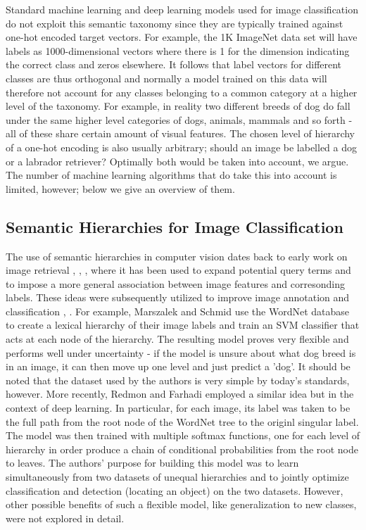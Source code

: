 \documentclass[12pt]{report}
\begin{document}
Standard machine learning and deep learning models used for image classification do not exploit this semantic taxonomy since they are typically trained against one-hot encoded target vectors. For example, the 1K ImageNet data set \cite{JiaDeng2009} will have labels as 1000-dimensional vectors where there is 1 for the dimension indicating the correct class and zeros elsewhere. It follows that label vectors for different classes are thus orthogonal and normally a model trained on this data will therefore not account for any classes belonging to a common category at a higher level of the taxonomy. For example, in reality two different breeds of dog do fall under the same higher level categories of dogs, animals, mammals and so forth - all of these share certain amount of visual features. The chosen level of hierarchy of a one-hot encoding is also usually arbitrary; should an image be labelled a dog or a labrador retriever? Optimally both would be taken into account, we argue. The number of machine learning algorithms that do take this into account is limited, however; below we give an overview of them.

\subsection{Semantic Hierarchies for Image Classification}
The use of semantic hierarchies in computer vision dates back to early work on image retrieval \cite{Aslandogan1997}, \cite{Zhao2001}, \cite{Grosky2002} \cite{Barnard2001}, where it has been used to expand potential query terms and to impose a more general association between image features and corresonding labels. These ideas were subsequently utilized to improve image annotation and classification \cite{Srikanth2005}, \cite{Marszaek2007} \cite{Griffin2013}. For example, Marszalek and Schmid \cite{Marszaek2007} use the WordNet database to create a lexical hierarchy of their image labels and train an SVM classifier \cite{Scholkopf2002} that acts at each node of the hierarchy. The resulting model proves very flexible and performs well under uncertainty - if the model is unsure about what dog breed is in an image, it can then move up one level and just predict a 'dog'. It should be noted that the dataset used by the authors is very simple by today's standards, however. More recently, Redmon and Farhadi \cite{Redmon} employed a similar idea but in the context of deep learning. In particular, for each image, its label was taken to be the full path from the root node of the WordNet tree to the originl singular label. The model was then trained with multiple softmax functions, one for each level of hierarchy in order produce a chain of conditional probabilities from the root node to leaves. The authors' purpose for building this model was to learn simultaneously from two datasets of unequal hierarchies and to jointly optimize classification and detection (locating an object) on the two datasets. However, other possible benefits of such a flexible model, like generalization to new classes, were not explored in detail. 
\end{document}

